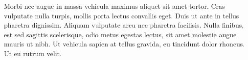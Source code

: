Morbi nec augue in massa vehicula maximus aliquet sit amet tortor. Cras vulputate nulla turpis, mollis porta lectus convallis eget. Duis ut ante in tellus pharetra dignissim. Aliquam vulputate arcu nec pharetra facilisis. Nulla finibus, est sed sagittis scelerisque, odio metus egestas lectus, sit amet molestie augue mauris ut nibh. Ut vehicula sapien at tellus gravida, eu tincidunt dolor rhoncus. Ut eu rutrum velit.